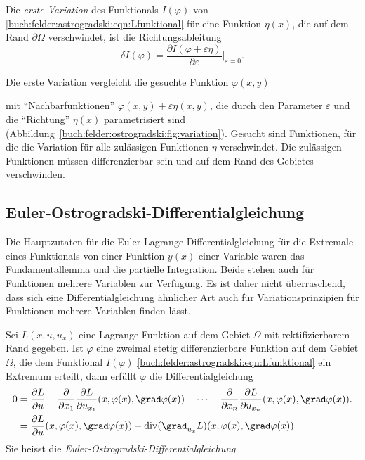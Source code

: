 \begin{definition}[1.~Variation]
Die {\em erste Variation} des Funktionals $I(\varphi)$ von
\eqref{buch:felder:astrogradski:eqn:Lfunktional}
für eine Funktion $\eta(x)$, die auf dem Rand $\partial\Omega$ verschwindet,
ist die Richtungsableitung
\[
\delta I(\varphi)
=
\frac{\partial I(\varphi+\varepsilon \eta)}{\partial \varepsilon}
\bigg|_{\varepsilon=0}.
\]
\end{definition}

Die erste Variation vergleicht die gesuchte Funktion $\varphi(x,y)$

mit ``Nachbarfunktionen'' $\varphi(x,y)+\varepsilon\eta(x,y)$,
die durch den Parameter $\varepsilon$ und die ``Richtung''
$\eta(x)$ parametrisiert sind
(Abbildung~\ref{buch:felder:ostrogradski:fig:variation}).
Gesucht sind Funktionen, für die die Variation für alle zulässigen
Funktionen $\eta$ verschwindet.
Die zulässigen Funktionen müssen differenzierbar sein und auf dem
Rand des Gebietes verschwinden.

%
%
\subsection{Euler-Ostrogradski-Differentialgleichung}
Die Hauptzutaten für die Euler-Lagrange-Differentialgleichung für
die Extremale eines Funktionals von einer Funktion $y(x)$ einer
Variable waren das Fundamentallemma und die partielle Integration.
Beide stehen auch für Funktionen mehrere Variablen zur Verfügung.
Es ist daher nicht überraschend, dass sich eine Differentialgleichung
ähnlicher Art auch für Variationsprinzipien für Funktionen mehrere
Variablen finden lässt.

\begin{satz}
Sei $L(x,u,u_x)$ eine Lagrange-Funktion auf dem Gebiet $\Omega$ mit
rektifizierbarem Rand gegeben.
Ist $\varphi$ eine zweimal stetig differenzierbare Funktion auf
dem Gebiet $\Omega$, die dem Funktional $I(\varphi)$ 
\eqref{buch:felder:astrogradski:eqn:Lfunktional}
ein Extremum erteilt, dann erfüllt $\varphi$ die Differentialgleichung
\begin{equation}
\begin{aligned}
0
&=
\frac{\partial L}{\partial u} 
-
\frac{\partial}{\partial x_1}
\frac{\partial L}{\partial u_{x_1}}(x,\varphi(x),\grad\varphi(x))
-
\dots
-
\frac{\partial}{\partial x_n}
\frac{\partial L}{\partial u_{x_n}}(x,\varphi(x),\grad\varphi(x)).
\\
&=
\frac{\partial L}{\partial u}(x,\varphi(x),\grad\varphi(x))
-
\operatorname{div}
(\grad_{u_x} L)(x,\varphi(x),\grad\varphi(x))
\end{aligned}
\label{buch:felder:ostrogradski:eqn:euler-ostrogradski}
\end{equation}
Sie heisst die {\em Euler-Ostrogradski-Differentialgleichung}.
%
\end{satz}

